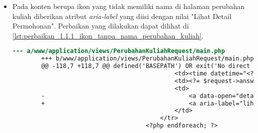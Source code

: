 \begin{itemize}
\begin{lstlisting}[frame=single, label={lst:perbaikan_1.1.1_ikon_tanpa_nama_manajemen_cetak_transkrip}, language=diff, caption=Perbaikan Kriteria Sukses 1.1.1 - Ikon Tanpa Nama di Halaman Manajemen Cetak Transkrip]
                                                </button>
                                            </div>
        -                                    <a data-open="cetak<?= $request->id ?>"><i class="fi-print"></i></a>
        +                                    <a aria-label="cetak permohonan" data-open="cetak<?= $request->id ?>"><i class="fi-print"></i></a>
                                            <div class="reveal" id="hapus<?= $request->id ?>" data-reveal>
                                                <h5>Hapus Permohonan</h5>
                                                <form method="POST" action="/TranskripManage/remove">
        @@ -146,7 +146,7 @@ defined('BASEPATH') OR exit('No direct script access allowed');
                                                    <span aria-hidden="true">&times;</span>
                                                </button>
                                            </div>
        -                                    <a data-open="hapus<?= $request->id ?>"><i class="fi-trash"></i></a>
        +                                    <a aria-label="hapus permohonan" data-open="hapus<?= $request->id ?>"><i class="fi-trash"></i></a>
                                        </td>
                                    </tr>
                                <?php endforeach; ?>
    \end{lstlisting}

    \item Pada konten berupa ikon yang tidak memiliki nama di halaman perubahan kuliah diberikan atribut \textit{aria-label} yang diisi dengan nilai "Lihat Detail Permohonan". Perbaikan yang dilakukan dapat dilihat di \ref{lst:perbaikan_1.1.1_ikon_tanpa_nama_perubahan_kuliah}.
    \begin{lstlisting}[frame=single, label={lst:perbaikan_1.1.1_ikon_tanpa_nama_perubahan_kuliah}, language=diff, caption=Perbaikan Kriteria Sukses 1.1.1 - Ikon Tanpa Nama di Halaman Perubahan Kuliah]
        --- a/www/application/views/PerubahanKuliahRequest/main.php
        +++ b/www/application/views/PerubahanKuliahRequest/main.php
        @@ -118,7 +118,7 @@ defined('BASEPATH') OR exit('No direct script access allowed');
                                             <td><time datetime="<?= $request->answeredDateTime ?>"><?= $request->answeredDateString ?></time></td>
                                             <td><?= $request->answeredMessage ?></td>
                                             <td>
        -                                        <a data-open="detail<?= $request->id ?>"><i class="fi-eye"></i></a>
        +                                        <a aria-label="lihat detail permohonan" data-open="detail<?= $request->id ?>"><i class="fi-eye"></i></a>
                                             </td>
                                         </tr>
                                     <?php endforeach; ?>        
    \end{lstlisting}


\end{itemize}
